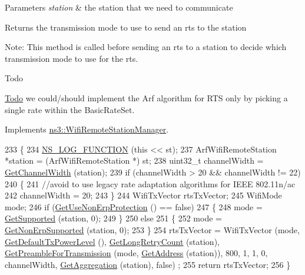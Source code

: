 \begin{DoxyParams}{Parameters}
{\em station} & the station that we need to communicate\\
\hline
\end{DoxyParams}
\begin{DoxyReturn}{Returns}
the transmission mode to use to send an rts to the station
\end{DoxyReturn}
Note\+: This method is called before sending an rts to a station to decide which transmission mode to use for the rts. \begin{DoxyRefDesc}{Todo}
\item[\hyperlink{todo__todo000169}{Todo}]we could/should implement the Arf algorithm for R\+TS only by picking a single rate within the Basic\+Rate\+Set. \end{DoxyRefDesc}


Implements \hyperlink{classns3_1_1WifiRemoteStationManager_abf44eccb31d4b1b58644fd6721d132c9}{ns3\+::\+Wifi\+Remote\+Station\+Manager}.


\begin{DoxyCode}
233 \{
234   \hyperlink{log-macros-disabled_8h_a90b90d5bad1f39cb1b64923ea94c0761}{NS\_LOG\_FUNCTION} (\textcolor{keyword}{this} << st);
237   ArfWifiRemoteStation *station = (ArfWifiRemoteStation *) st;
238   uint32\_t channelWidth = \hyperlink{classns3_1_1WifiRemoteStationManager_a918213c5b9fa629c4986f6d90521bbd4}{GetChannelWidth} (station);
239   \textcolor{keywordflow}{if} (channelWidth > 20 && channelWidth != 22)
240     \{
241       \textcolor{comment}{//avoid to use legacy rate adaptation algorithms for IEEE 802.11n/ac}
242       channelWidth = 20;
243     \}
244   WifiTxVector rtsTxVector;
245   WifiMode mode;
246   \textcolor{keywordflow}{if} (\hyperlink{classns3_1_1WifiRemoteStationManager_a2d3d93f08995e554960a177a52f90f2f}{GetUseNonErpProtection} () == \textcolor{keyword}{false})
247     \{
248       mode = \hyperlink{classns3_1_1WifiRemoteStationManager_a995c8bae0d84b168fd3e8bc9ecaacdd4}{GetSupported} (station, 0);
249     \}
250   \textcolor{keywordflow}{else}
251     \{
252       mode = \hyperlink{classns3_1_1WifiRemoteStationManager_a3df8f1931f1fce653e5990a2821b44c6}{GetNonErpSupported} (station, 0);
253     \}
254   rtsTxVector = WifiTxVector (mode, \hyperlink{classns3_1_1WifiRemoteStationManager_acff2fc859ee6b4c66ea7a83dd075b5d6}{GetDefaultTxPowerLevel} (), 
      \hyperlink{classns3_1_1WifiRemoteStationManager_aac10b1403fb0bd670f8a8bd6d7e48304}{GetLongRetryCount} (station), \hyperlink{classns3_1_1WifiRemoteStationManager_a0f44967cbd7488baada4802ebc642110}{GetPreambleForTransmission} (mode, 
      \hyperlink{classns3_1_1WifiRemoteStationManager_ac9ccc8c514bd8d2af05c290e63461a2a}{GetAddress} (station)), 800, 1, 1, 0, channelWidth, \hyperlink{classns3_1_1WifiRemoteStationManager_a5421c8d510cb16eebeac9f2ea9dd73c3}{GetAggregation} (station), \textcolor{keyword}{false})
      ;
255   \textcolor{keywordflow}{return} rtsTxVector;
256 \}
\end{DoxyCode}


